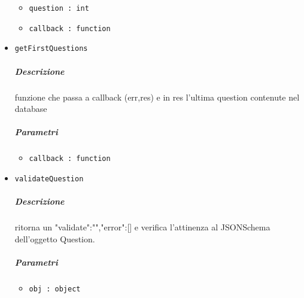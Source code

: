 \documentclass[../ManualeSviluppatore_v2.0.0.tex]{subfiles}
\begin{document}
\begin{itemize}
\begin{itemize}
	\item \texttt{question : int}
	\item \texttt{callback : function}
\end{itemize}
\item \texttt{getFirstQuestions}
\subparagraph{Descrizione}funzione che passa a callback (err,res) e in res l'ultima question contenute nel database
\subparagraph{Parametri}
\begin{itemize}
	\item \texttt{callback : function}
\end{itemize}
\item \texttt{validateQuestion}
\subparagraph{Descrizione}ritorna un {"validate":"","error":[]}  e verifica l'attinenza al JSONSchema dell'oggetto Question.
\subparagraph{Parametri}
\begin{itemize}
	\item \texttt{obj : object}
\end{itemize}
\end{itemize}
\end{document}
